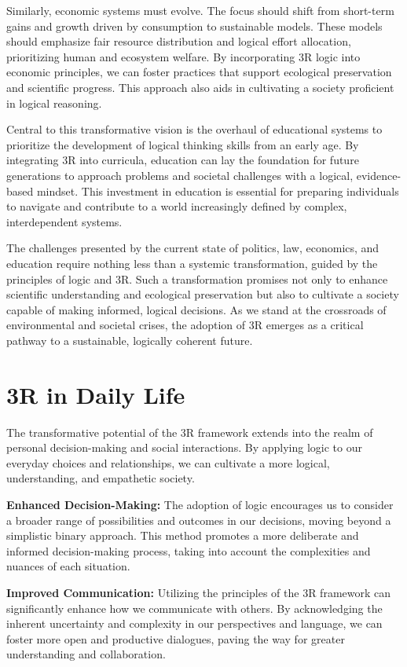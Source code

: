 \documentclass[12pt]{article}
\begin{document}
Similarly, economic systems must evolve. The focus should shift from short-term gains and growth driven by consumption to sustainable models. These models should emphasize fair resource distribution and logical effort allocation, prioritizing human and ecosystem welfare. By incorporating 3R logic into economic principles, we can foster practices that support ecological preservation and scientific progress. This approach also aids in cultivating a society proficient in logical reasoning.


Central to this transformative vision is the overhaul of educational systems to prioritize the development of logical thinking skills from an early age. By integrating 3R into curricula, education can lay the foundation for future generations to approach problems and societal challenges with a logical, evidence-based mindset. This investment in education is essential for preparing individuals to navigate and contribute to a world increasingly defined by complex, interdependent systems.

The challenges presented by the current state of politics, law, economics, and education require nothing less than a systemic transformation, guided by the principles of logic and 3R. Such a transformation promises not only to enhance scientific understanding and ecological preservation but also to cultivate a society capable of making informed, logical decisions. As we stand at the crossroads of environmental and societal crises, the adoption of 3R emerges as a critical pathway to a sustainable, logically coherent future.

\section*{3R in Daily Life}

The transformative potential of the 3R framework extends into the realm of personal decision-making and social interactions. By applying \qbit{} logic to our everyday choices and relationships, we can cultivate a more logical, understanding, and empathetic society.

\textbf{Enhanced Decision-Making:} The adoption of \qbit{} logic encourages us to consider a broader range of possibilities and outcomes in our decisions, moving beyond a simplistic binary approach. This method promotes a more deliberate and informed decision-making process, taking into account the complexities and nuances of each situation.

\textbf{Improved Communication:} Utilizing the principles of the 3R framework can significantly enhance how we communicate with others. By acknowledging the inherent uncertainty and complexity in our perspectives and language, we can foster more open and productive dialogues, paving the way for greater understanding and collaboration.
\end{document}
